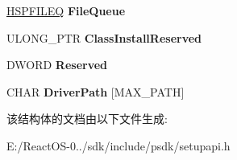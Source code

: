 \begin{DoxyCompactItemize}
\item 
\mbox{\label{struct___s_p___d_e_v_i_n_s_t_a_l_l___p_a_r_a_m_s___a_a139a70c0d451df1ffa8f36c8b31125f1}} 
\hyperlink{interfacevoid}{H\+S\+P\+F\+I\+L\+EQ} {\bfseries File\+Queue}
\item 
\mbox{\label{struct___s_p___d_e_v_i_n_s_t_a_l_l___p_a_r_a_m_s___a_a14ba4e0c8b0a5482845b293047e798e1}} 
U\+L\+O\+N\+G\+\_\+\+P\+TR {\bfseries Class\+Install\+Reserved}
\item 
\mbox{\label{struct___s_p___d_e_v_i_n_s_t_a_l_l___p_a_r_a_m_s___a_a36ca688b848d6fbde3f0fa9ea63347fc}} 
D\+W\+O\+RD {\bfseries Reserved}
\item 
\mbox{\label{struct___s_p___d_e_v_i_n_s_t_a_l_l___p_a_r_a_m_s___a_a355612359c0631463b4cfc33cd575e51}} 
C\+H\+AR {\bfseries Driver\+Path} \mbox{[}M\+A\+X\+\_\+\+P\+A\+TH\mbox{]}
\end{DoxyCompactItemize}


该结构体的文档由以下文件生成\+:\begin{DoxyCompactItemize}
\item 
E\+:/\+React\+O\+S-\/0../sdk/include/psdk/setupapi.\+h\end{DoxyCompactItemize}
